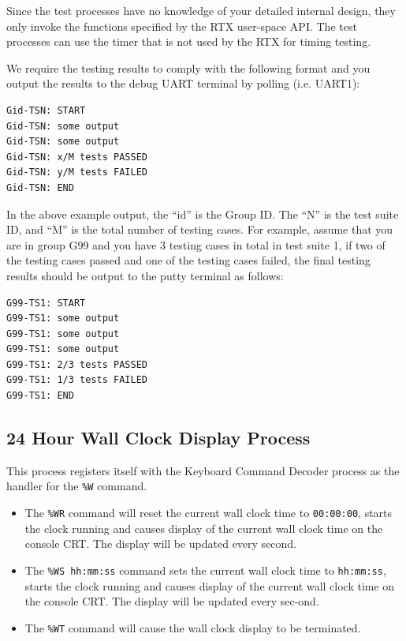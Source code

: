 Since the test processes have no knowledge of your detailed internal design, they only invoke the functions specified by the RTX user-space API. The test processes can use the timer that is not used by the RTX for timing testing.

We require the testing results to comply with the following format and you output the results to the debug UART terminal by polling (i.e. UART1):
\begin{verbatim}
Gid-TSN: START
Gid-TSN: some output
Gid-TSN: some output
Gid-TSN: x/M tests PASSED 
Gid-TSN: y/M tests FAILED
Gid-TSN: END
\end{verbatim}
In the above example output, the ``id'' is the Group ID. The ``N'' is the test suite ID, and ``M'' is the total number of testing cases. 
For example, assume that you are in group G99 and you have 3 testing cases in total in test suite 1, if two of the testing cases passed and one of the testing cases failed, the final testing results should be output to the putty terminal as follows:
\begin{verbatim}
G99-TS1: START
G99-TS1: some output 
G99-TS1: some output 
G99-TS1: some output 
G99-TS1: 2/3 tests PASSED
G99-TS1: 1/3 tests FAILED
G99-TS1: END
\end{verbatim}

\subsection{24 Hour Wall Clock Display Process}
\label{subsec_clock_proc}
This process registers itself with the Keyboard Command Decoder process as the handler for the \verb+%W+ command. 
\begin{itemize}
\item The \verb+%WR+ command will reset the current wall clock time to \verb+00:00:00+, starts the clock running and causes display of the current wall clock time on the console CRT. The display will be updated every second. 
\item The \verb+%WS hh:mm:ss+ command sets the current wall clock time to \verb+hh:mm:ss+, starts the clock running and causes display of the current wall clock time on the console CRT. The display will be updated every sec-ond. 
\item The \verb+%WT+ command will cause the wall clock display to be terminated. 
\end{itemize}

